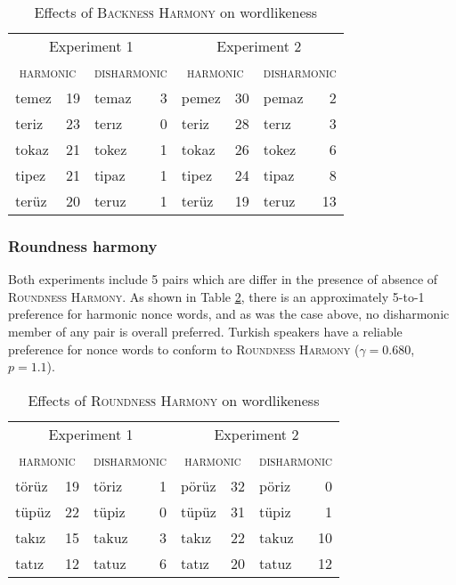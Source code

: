 \begin{table}
\centering
\begin{tabular}{lrlr|lrlr}
\toprule
\multicolumn{4}{c|}{Experiment 1} & \multicolumn{4}{c}{Experiment 2} \\
\multicolumn{2}{c}{\textsc{harmonic}} & \multicolumn{2}{c|}{\textsc{disharmonic}} & \multicolumn{2}{c}{\textsc{harmonic}} & \multicolumn{2}{c}{\textsc{disharmonic}} \\
\midrule
{temez} & 19            & {temaz} & 3 & {pemez} & 30            & {pemaz} & 2 \\
{teriz} & 23            & {terız} & 0 & {teriz} & 28            & {terız} & 3 \\
{tokaz} & 21            & {tokez} & 1 & {tokaz} & 26            & {tokez} & 6 \\
{tipez} & 21            & {tipaz} & 1 & {tipez} & 24            & {tipaz} & 8 \\
{terüz} & 20            & {teruz} & 1 & {terüz} & 19            & {teruz} & 13 \\
\bottomrule
\end{tabular}
\caption{Effects of \textsc{Backness Harmony} on wordlikeness \citep[from][]{Zimmer1969}}
\label{bhw}
\end{table}

\subsubsection{Roundness harmony}

Both experiments include 5 pairs which are differ in the presence of absence of \textsc{Roundness Harmony}. As shown in Table \ref{rhw}, there is an approximately 5-to-1 preference for harmonic nonce words, and as was the case above, no disharmonic member of any pair is overall preferred. Turkish speakers have a reliable preference for nonce words to conform to \textsc{Roundness Harmony} ($\gamma = 0.680$, $p = 1.1$).

\begin{table}
\center
\begin{tabular}{lrlr|lrlr}
\toprule
\multicolumn{4}{c|}{Experiment 1} & \multicolumn{4}{c}{Experiment 2} \\
\multicolumn{2}{c}{\textsc{harmonic}} & \multicolumn{2}{c|}{\textsc{disharmonic}} & \multicolumn{2}{c}{\textsc{harmonic}} & \multicolumn{2}{c}{\textsc{disharmonic}} \\
\midrule
{törüz} & 19 & {töriz} & 1 & {pörüz} & 32 & {pöriz} & 0  \\
{tüpüz} & 22 & {tüpiz} & 0 & {tüpüz} & 31 & {tüpiz} & 1  \\
{takız} & 15 & {takuz} & 3 & {takız} & 22 & {takuz} & 10 \\
{tatız} & 12 & {tatuz} & 6 & {tatız} & 20 & {tatuz} & 12 \\
\bottomrule
\end{tabular}
\caption{Effects of \textsc{Roundness Harmony} on wordlikeness \citep[from][]{Zimmer1969}}
\label{rhw}
\end{table}

